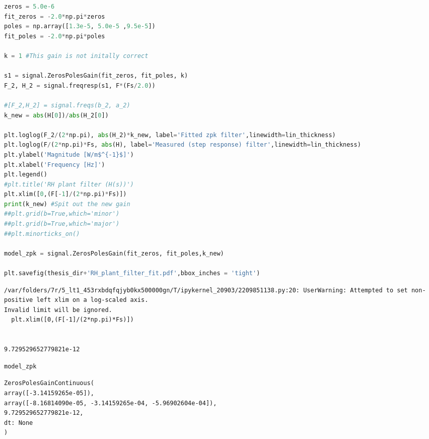 \begin{spacing}{1} \begin{lstlisting}[language=Python]
zeros = 5.0e-6
fit_zeros = -2.0*np.pi*zeros
poles = np.array([1.3e-5, 5.0e-5 ,9.5e-5])
fit_poles = -2.0*np.pi*poles

k = 1 #This gain is not initally correct

s1 = signal.ZerosPolesGain(fit_zeros, fit_poles, k)
F_2, H_2 = signal.freqresp(s1, F*(Fs/2.0))

#[F_2,H_2] = signal.freqs(b_2, a_2)
k_new = abs(H[0])/abs(H_2[0])

plt.loglog(F_2/(2*np.pi), abs(H_2)*k_new, label='Fitted zpk filter',linewidth=lin_thickness)
plt.loglog(F/(2*np.pi)*Fs, abs(H), label='Measured (step response) filter',linewidth=lin_thickness)
plt.ylabel('Magnitude [W/m$^{-1}$]')
plt.xlabel('Frequency [Hz]')
plt.legend()
#plt.title('RH plant filter (H(s))')
plt.xlim([0,(F[-1]/(2*np.pi)*Fs)])
print(k_new) #Spit out the new gain
##plt.grid(b=True,which='minor')
##plt.grid(b=True,which='major')
##plt.minorticks_on()

model_zpk = signal.ZerosPolesGain(fit_zeros, fit_poles,k_new)

plt.savefig(thesis_dir+'RH_plant_filter_fit.pdf',bbox_inches = 'tight')
\end{lstlisting} \end{spacing}

\begin{spacing}{1} \begin{lstlisting}
/var/folders/7r/5_lt1_453rxbdqfqjyb0kx500000gn/T/ipykernel_20903/2209851138.py:20: UserWarning: Attempted to set non-positive left xlim on a log-scaled axis.
Invalid limit will be ignored.
  plt.xlim([0,(F[-1]/(2*np.pi)*Fs)])


9.729529652779821e-12
\end{lstlisting} \end{spacing}


\begin{spacing}{1} \begin{lstlisting}[language=Python]
model_zpk
\end{lstlisting} \end{spacing}

\begin{spacing}{1} \begin{lstlisting}
ZerosPolesGainContinuous(
array([-3.14159265e-05]),
array([-8.16814090e-05, -3.14159265e-04, -5.96902604e-04]),
9.729529652779821e-12,
dt: None
)
\end{lstlisting} \end{spacing}

